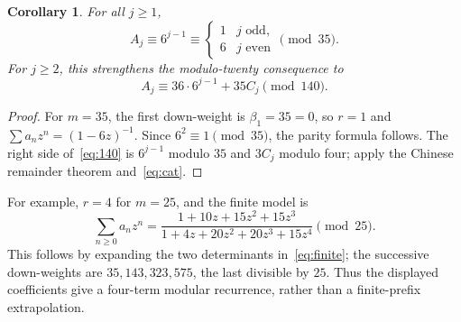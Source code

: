 \documentclass[11pt]{article}
\newtheorem{corollary}[theorem]{Corollary}
\begin{document}
\begin{corollary}\label{cor:35}
For all $j\geq1$,
\[
 A_j\equiv6^{j-1}\equiv
 \begin{cases}1&j\text{ odd},\\6&j\text{ even}\end{cases}\pmod{35}.
\]
For $j\geq2$, this strengthens the modulo-twenty consequence to
\begin{equation}\label{eq:140}
 A_j\equiv36\cdot6^{j-1}+35C_j\pmod{140}.
\end{equation}
\end{corollary}
\begin{proof}
For $m=35$, the first down-weight is $\beta_1=35=0$, so $r=1$ and
$\sum a_nz^n=(1-6z)^{-1}$. Since $6^2\equiv1\pmod{35}$, the
parity formula follows. The right side of~\eqref{eq:140} is
$6^{j-1}$ modulo $35$ and $3C_j$ modulo four; apply the Chinese
remainder theorem and~\eqref{eq:cat}.
\end{proof}

For example, $r=4$ for $m=25$, and the finite model is
\begin{equation}\label{eq:25}
 \sum_{n\geq0}a_nz^n=
 \frac{1+10z+15z^2+15z^3}{1+4z+20z^2+20z^3+15z^4}\pmod{25}.
\end{equation}
This follows by expanding the two determinants in~\eqref{eq:finite};
the successive down-weights are $35,143,323,575$, the last divisible
by $25$. Thus the displayed coefficients give a four-term modular
recurrence, rather than a finite-prefix extrapolation.
\end{document}
